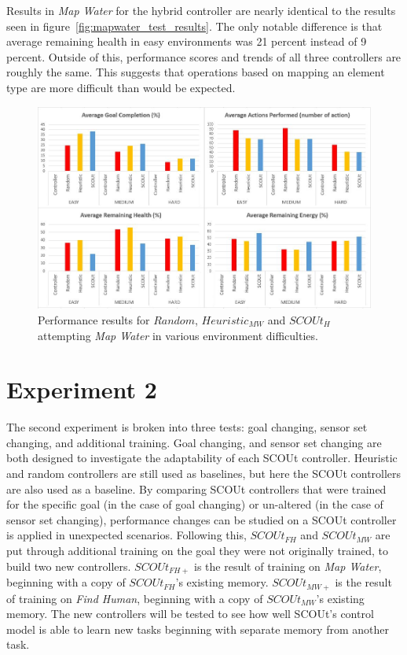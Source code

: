 Results in \textit{Map Water} for the hybrid controller are nearly identical to the results seen in figure~\ref{fig:mapwater_test_results}.
The only notable difference is that average remaining health in easy environments was 21 percent instead of 9 percent.
Outside of this, performance scores and trends of all three controllers are roughly the same.
This suggests that operations based on mapping an element type are more difficult than would be expected.

\begin{figure}[H]
  \centering
  \includegraphics[width=1.0\columnwidth]{Figures/Results/Experiment1/HybridMapWater.JPG}
  \caption[Experiment 1 Results: $SCOUt_{H}$ (Map Water)]{Performance results for $Random$, $Heuristic_{MW}$ and $SCOUt_{H}$ attempting \textit{Map Water} in various environment difficulties.}
  \label{fig:hybrid_mapwater_test_results}
\end{figure}


\section{Experiment 2} \label{sec:experiment2}
The second experiment is broken into three tests: goal changing, sensor set changing, and additional training.
Goal changing, and sensor set changing are both designed to investigate the adaptability of each SCOUt controller.
Heuristic and random controllers are still used as baselines, but here the SCOUt controllers are also used as a baseline.
By comparing SCOUt controllers that were trained for the specific goal (in the case of goal changing) or un-altered (in the case of sensor set changing), performance changes can be studied on a SCOUt controller is applied in unexpected scenarios.
Following this, $SCOUt_{FH}$ and $SCOUt_{MW}$ are put through additional training on the goal they were not originally trained, to build two new controllers.
$SCOUt_{FH+}$ is the result of training on \textit{Map Water}, beginning with a copy of $SCOUt_{FH}$'s existing memory.
$SCOUt_{MW+}$ is the result of training on \textit{Find Human}, beginning with a copy of $SCOUt_{MW}$'s existing memory.
The new controllers will be tested to see how well SCOUt's control model is able to learn new tasks beginning with separate memory from another task.


